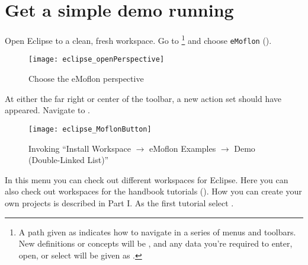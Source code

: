 \newpage
\genHeader

\section{Get a simple demo running}


\begin{stepbystep}
\hypertarget{simpleDemo common}{} 
\item
Open Eclipse to a clean, fresh workspace.
Go to  \footnote{A path given as  indicates how to navigate in a series of menus and toolbars.
New definitions or concepts will be , and any data you're required to enter, open, or select will be given as .} and choose \texttt{eMoflon} ().

\begin{figure}[htbp]
	\centering
  \texttt{[image: eclipse\_openPerspective]}
	\caption{Choose the eMoflon perspective}
	\label{eclipse:openPerspective}
\end{figure} 

\item
At either the far right or center of the toolbar, a new action set should have appeared.
Navigate to .
%
\vspace{0.5cm}
\begin{figure}[htbp]
	\centering
  \texttt{[image: eclipse\_MoflonButton]}
	\caption{Invoking \enquote{Install Workspace $\to$ eMoflon Examples $\to$ Demo (Double-Linked List)}}
	\label{eclipse:newMetamodel}
\end{figure}

\item
In this menu you can check out different workspaces for Eclipse. 
Here you can also check out workspaces for the handbook tutorials ().
How you can create your own projects is described in Part I.
As the first tutorial select . 


\end{stepbystep}
